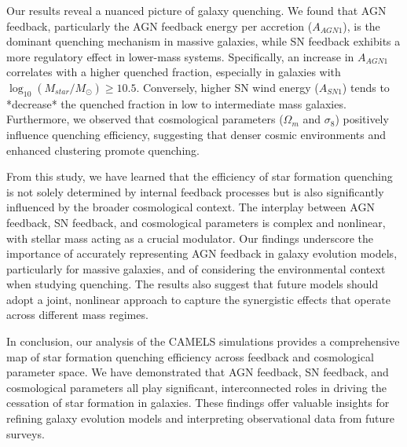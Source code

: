 \documentclass[twocolumn]{aastex631}
\begin{document}
Our results reveal a nuanced picture of galaxy quenching. We found that AGN feedback, particularly the AGN feedback energy per accretion (\(A_{AGN1}\)), is the dominant quenching mechanism in massive galaxies, while SN feedback exhibits a more regulatory effect in lower-mass systems. Specifically, an increase in \(A_{AGN1}\) correlates with a higher quenched fraction, especially in galaxies with \(\log_{10}(M_{star}/M_\odot) \geq 10.5\). Conversely, higher SN wind energy (\(A_{SN1}\)) tends to *decrease* the quenched fraction in low to intermediate mass galaxies. Furthermore, we observed that cosmological parameters (\(\Omega_m\) and \(\sigma_8\)) positively influence quenching efficiency, suggesting that denser cosmic environments and enhanced clustering promote quenching.

From this study, we have learned that the efficiency of star formation quenching is not solely determined by internal feedback processes but is also significantly influenced by the broader cosmological context. The interplay between AGN feedback, SN feedback, and cosmological parameters is complex and nonlinear, with stellar mass acting as a crucial modulator. Our findings underscore the importance of accurately representing AGN feedback in galaxy evolution models, particularly for massive galaxies, and of considering the environmental context when studying quenching. The results also suggest that future models should adopt a joint, nonlinear approach to capture the synergistic effects that operate across different mass regimes.

In conclusion, our analysis of the CAMELS simulations provides a comprehensive map of star formation quenching efficiency across feedback and cosmological parameter space. We have demonstrated that AGN feedback, SN feedback, and cosmological parameters all play significant, interconnected roles in driving the cessation of star formation in galaxies. These findings offer valuable insights for refining galaxy evolution models and interpreting observational data from future surveys.
\

{}

\end{document}
